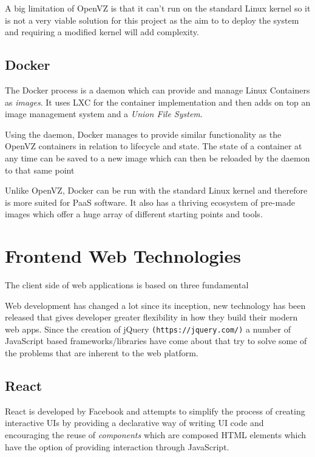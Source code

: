 A big limitation of OpenVZ is that it can't run on the standard Linux kernel so it is not a very viable solution for this project as the aim to to deploy the system and requiring a modified kernel will add complexity.

\subsection{Docker}

The Docker process is a daemon which can provide and manage Linux Containers as \textit{images}. It uses LXC for the container implementation and then adds on top an image management system and a \textit{Union File System}.

Using the daemon, Docker manages to provide similar functionality as the OpenVZ containers in relation to lifecycle and state. The state of a container at any time can be saved to a new image which can then be reloaded by the daemon to that same point

Unlike OpenVZ, Docker can be run with the standard Linux kernel and therefore is more suited for PaaS software. It also has a thriving ecosystem of pre-made images which offer a huge array of different starting points and tools.

\section{Frontend Web Technologies}

The client side of web applications is based on three fundamental 

Web development has changed a lot since its inception, new technology has been released that gives developer greater flexibility in how they build their modern web apps. Since the creation of jQuery \texttt{(https://jquery.com/)} a number of JavaScript based frameworks/libraries have come about that try to solve some of the problems that are inherent to the web platform.

\subsection{React}

React is developed by Facebook and attempts to simplify the process of creating interactive UIs by providing a declarative way of writing UI code and encouraging the reuse of \textit{components} which are composed HTML elements which have the option of providing interaction through JavaScript.


